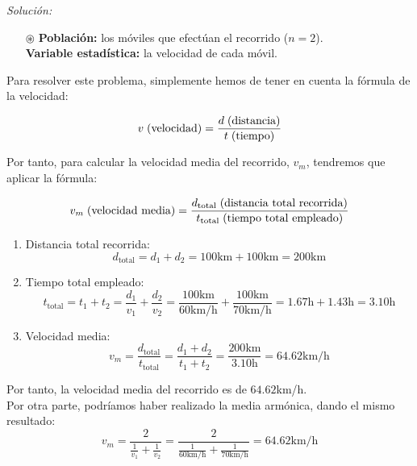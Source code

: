 \documentclass[11pt,a4paper]{article}
\theoremstyle{definition}
\begin{document}
{\color{grey}\hrulefill}

\emph{Solución:}

\begin{enumerate}[label=\emph{\alph*})]
	\item[$\circledast$] \textbf{Población:} los móviles que efectúan el recorrido ($n=2$). \\ \textbf{Variable estadística:} la velocidad de cada móvil.
\end{enumerate}

Para resolver este problema, simplemente hemos de tener en cuenta la fórmula de la velocidad:

$$ v\hspace{0.1cm}\text{(velocidad)} = \frac{d\hspace{0.1cm}\text{(distancia)}}{t\hspace{0.1cm}\text{(tiempo)}} $$

Por tanto, para calcular la velocidad media del recorrido, $v_m$, tendremos que aplicar la fórmula:

$$ v_m\hspace{0.1cm}\text{(velocidad media)} = \frac{d_{\text{total}}\hspace{0.1cm}\text{(distancia total recorrida)}}{t_{\text{total}}\hspace{0.1cm}\text{(tiempo total empleado)}} $$

\begin{enumerate}
	\item Distancia total recorrida: \\
	$$ d_{\text{total}} = d_1 + d_2 = 100 \text{km} + 100 \text{km} = 200 \text{km} $$
	\item Tiempo total empleado: \\
	$$ t_{\text{total}} = t_1 + t_2 = \frac{d_1}{v_1} + \frac{d_2}{v_2} = \frac{100 \text{km}}{60 \text{km/h}} + \frac{100 \text{km}}{70 \text{km/h}} = 1.67 \text{h} + 1.43 \text{h} = 3.10 \text{h} $$
	\item Velocidad media:
	$$ v_m = \frac{d_{\text{total}}}{t_{\text{total}}} = \frac{d_1+d_2}{t_1+t_2} = \frac{200 \text{km}}{3.10 \text{h}} = 64.62\text{km/h} $$
\end{enumerate}

Por tanto, la velocidad media del recorrido es de $64.62$km/h. \\

Por otra parte, podríamos haber realizado la media armónica, dando el mismo resultado:
$$ v_m = \frac{2}{\frac{1}{v_1} + \frac{1}{v_2}} = \frac{2}{\frac{1}{60\text{km/h}} + \frac{1}{70\text{km/h}}} = 64.62\text{km/h}$$
\end{document}
